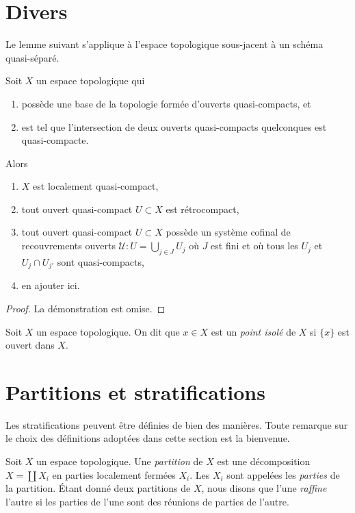 \section{Divers}
\label{section-miscellany}


\noindent
Le lemme suivant s'applique à l'espace topologique sous-jacent à un schéma
quasi-séparé.

\begin{lemma}
\label{lemma-topology-quasi-separated-scheme}
Soit $X$ un espace topologique qui
\begin{enumerate}
\item possède une base de la topologie formée d'ouverts quasi-compacts, et
\item est tel que l'intersection de deux ouverts quasi-compacts
quelconques est quasi-compacte.
\end{enumerate}
Alors
\begin{enumerate}
\item $X$ est localement quasi-compact,
\item tout ouvert quasi-compact $U \subset X$ est rétrocompact,
\item tout ouvert quasi-compact $U \subset X$ possède un système cofinal de
recouvrements ouverts $\mathcal{U} : U = \bigcup_{j\in J} U_j$ où $J$ est fini
et où tous les $U_j$ et $U_j \cap U_{j'}$ sont quasi-compacts,
\item en ajouter ici.
\end{enumerate}
\end{lemma}

\begin{proof}
La démonstration est omise.
\end{proof}

\begin{definition}
\label{definition-isolated-point}
Soit $X$ un espace topologique. On dit que $x \in X$ est un
{\it point isolé} de $X$ si $\{x\}$ est ouvert dans $X$.
\end{definition}

\section{Partitions et stratifications}
\label{section-stratifications}

\noindent
Les stratifications peuvent être définies de bien des manières. Toute remarque
sur le choix des définitions adoptées dans cette section est la bienvenue.

\begin{definition}
\label{definition-paritition}
Soit $X$ un espace topologique. Une {\it partition} de $X$ est une
décomposition $X = \coprod X_i$ en parties localement fermées $X_i$.
Les $X_i$ sont appelées les {\it parties} de la partition.
Étant donné deux partitions de $X$, nous disons que l'une {\it raffine}
l'autre si les parties de l'une sont des réunions de parties de l'autre.
\end{definition}

